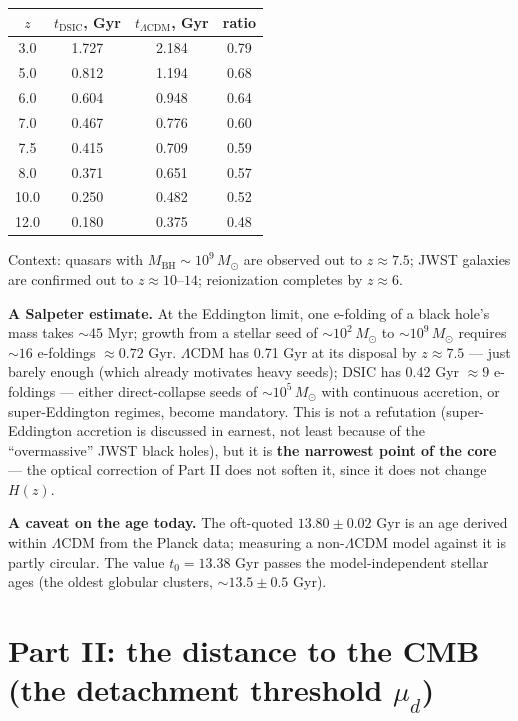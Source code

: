 \documentclass[a4paper,10pt]{article}
\begin{document}
\begin{table}[htbp]
\centering
\small
\begin{tabular}{@{}cccc@{}}
\toprule
$z$ & $t_{\text{DSIC}}$, Gyr & $t_{\Lambda\text{CDM}}$, Gyr & ratio \\
\midrule
3.0 & 1.727 & 2.184 & 0.79 \\
5.0 & 0.812 & 1.194 & 0.68 \\
6.0 & 0.604 & 0.948 & 0.64 \\
7.0 & 0.467 & 0.776 & 0.60 \\
7.5 & 0.415 & 0.709 & 0.59 \\
8.0 & 0.371 & 0.651 & 0.57 \\
10.0 & 0.250 & 0.482 & 0.52 \\
12.0 & 0.180 & 0.375 & 0.48 \\
\bottomrule
\end{tabular}
\end{table}

Context: quasars with $M_{\text{BH}} \sim 10^9\,M_\odot$ are observed out to $z \approx 7.5$; JWST galaxies are confirmed out to $z \approx 10\text{--}14$; reionization completes by $z \approx 6$.

\medskip
\noindent\textbf{A Salpeter estimate.} At the Eddington limit, one e-folding of a black hole's mass takes ${\sim}45$ Myr; growth from a stellar seed of ${\sim}10^2\,M_\odot$ to ${\sim}10^9\,M_\odot$ requires ${\sim}16$ e-foldings $\approx 0.72$ Gyr. $\Lambda$CDM has 0.71 Gyr at its disposal by $z \approx 7.5$ --- just barely enough (which already motivates heavy seeds); DSIC has 0.42 Gyr $\approx 9$ e-foldings --- either direct-collapse seeds of ${\sim}10^5\,M_\odot$ with continuous accretion, or super-Eddington regimes, become mandatory. This is not a refutation (super-Eddington accretion is discussed in earnest, not least because of the ``overmassive'' JWST black holes), but it is \textbf{the narrowest point of the core} --- the optical correction of Part II does not soften it, since it does not change $H(z)$.

\medskip
\noindent\textbf{A caveat on the age today.} The oft-quoted $13.80 \pm 0.02$ Gyr is an age derived within $\Lambda$CDM from the Planck data; measuring a non-$\Lambda$CDM model against it is partly circular. The value $t_0 = 13.38$ Gyr passes the model-independent stellar ages (the oldest globular clusters, ${\sim}13.5 \pm 0.5$ Gyr).

\section{Part II: the distance to the CMB (the detachment threshold $\mu_d$)}
\end{document}
